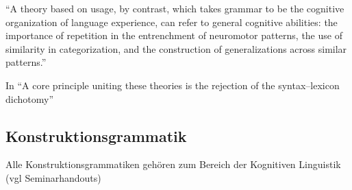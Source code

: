 \begin{itemize}
        ``A theory based on usage, by contrast, which takes grammar
        to be the cognitive organization of language experience, can refer to general cognitive
        abilities: the importance of repetition in the entrenchment of neuromotor patterns, the
        use of similarity in categorization, and the construction of generalizations across similar
        patterns.''

        In \cite{Eskildsen08} ``A core principle uniting these theories is the rejection of the syntax–lexicon
        dichotomy''
\end{itemize}


\subsection{Konstruktionsgrammatik}
Alle Konstruktionsgrammatiken gehören zum Bereich der Kognitiven Linguistik (vgl Seminarhandouts)

